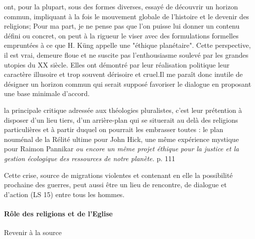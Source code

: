 \begin{singlequote}
   ont, pour la plupart, sous des formes diverses, essayé de découvrir un horizon commun, impliquant à la fois le mouvement globale de l'histoire et le devenir des religions; Pour ma part, je ne pense pas que l'on puisse lui donner un contenu défini ou concret, on peut à la rigueur le viser avec des formulations formelles empruntées à ce que H. Küng appelle une "éthique planétaire". Cette perspective, il est vrai, demeure floue et ne suscite pas l’enthousiasme soulevé par les grandes utopies du XX siècle. Elles ont démontré par leur réalisation politique leur caractère illusoire et trop souvent dérisoire et cruel.Il me paraît donc inutile de désigner un horizon commun qui serait supposé favoriser le dialogue en proposant une base minimale d'accord.   \cite[p 243]{duquoc_unique_2002}
 
\end{singlequote}
\begin{singlequote}
    

 la principale critique adressée aux théologies pluralistes, c’est leur prétention à disposer d’un lieu tiers, d’un arrière-plan qui se situerait au delà des religions particulières et à partir duquel on pourrait les embrasser toutes : le plan nouménal de la Rélité ultime pour John Hick, une même expérience mystique pour Raimon Pannikar \textit{ou encore un même projet éthique pour la justice et la gestion écologique des ressources de notre planète.}   p. 111  \cite{cheno_dieu_2017}

\end{singlequote}
\begin{singlequote}
    Cette crise, source de migrations violentes et contenant en elle la possibilité prochaine des guerres, peut aussi être un lieu de rencontre, de dialogue et d’action (LS 15) entre tous les hommes.
\end{singlequote}


\paragraph{Rôle des religions et de l'Eglise} Revenir à la source 

